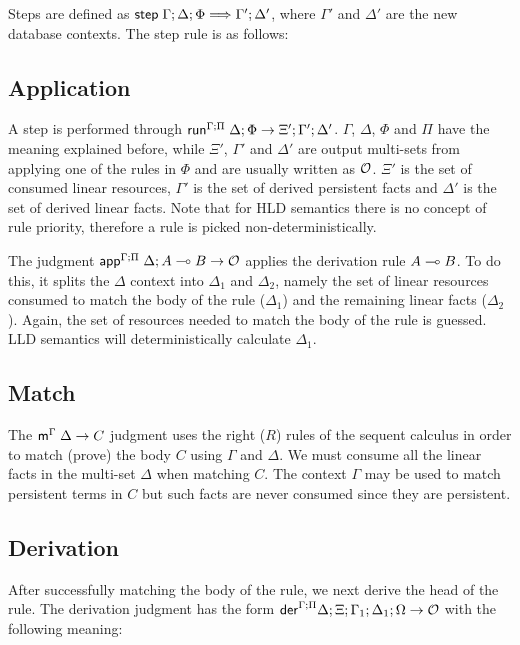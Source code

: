 Steps are defined as $\mathsf{step} \; \Gamma; \Delta; \Phi \Longrightarrow \Gamma';
\Delta'$, where $\Gamma'$ and $\Delta'$ are the new database contexts. The step
rule is as follows:



\subsection{Application}

A step is performed through
$\mathsf{run}^{\Gamma ; \Pi} \; \Delta ; \Phi \rightarrow \Xi' ; \Gamma'; \Delta'$.  $\Gamma$, $\Delta$,
$\Phi$ and $\Pi$ have the meaning explained before, while $\Xi'$, $\Gamma'$ and
$\Delta'$ are output multi-sets from applying one of the rules in $\Phi$ and are
usually written as $\mathcal{O}$. $\Xi'$ is the set of consumed linear resources,
$\Gamma'$ is the set of derived persistent facts and $\Delta'$ is the set of
derived linear facts.  Note that for HLD semantics there is no concept of rule
priority, therefore a rule is picked non-deterministically.

The judgment $\mathsf{app}^{\Gamma ; \Pi} \; \Delta ; A \multimap B \rightarrow \mathcal{O}$ applies the
derivation rule $A \multimap B$. To do this, it splits the $\Delta$ context into
$\Delta_1$ and $\Delta_2$, namely the set of linear resources consumed to match
the body of the rule ($\Delta_1$) and the remaining linear facts ($\Delta_2$).
Again, the set of resources needed to match the body of the rule is guessed. LLD
semantics will deterministically calculate $\Delta_1$.



\subsection{Match}

The $\mathsf{m}^{\Gamma} \; \Delta \rightarrow C$ judgment uses the right ($R$) rules of the sequent
calculus in order to match (prove) the body $C$ using $\Gamma$ and $\Delta$. We
must consume all the linear facts in the multi-set $\Delta$ when matching $C$.
The context $\Gamma$ may be used to match persistent terms in $C$ but such facts
are never consumed since they are persistent.



\subsection{Derivation}

After successfully matching the body of the rule, we next derive the head of the
rule. The derivation judgment has the form
$\mathsf{der}^{\Gamma ; \Pi} \Delta ; \Xi; \Gamma_1; \Delta_1; \Omega \rightarrow \mathcal{O}$ with the
following meaning:

